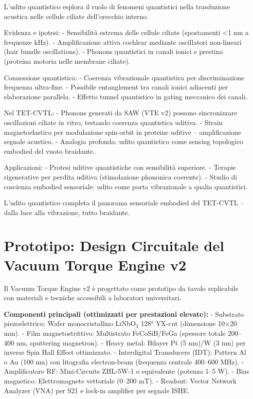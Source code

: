 \documentclass[11pt,a4paper]{article}
\begin{document}
L'udito quantistico esplora il ruolo di fenomeni quantistici nella trasduzione acustica nelle cellule ciliate dell'orecchio interno.

Evidenza e ipotesi:
- Sensibilità estrema delle cellule ciliate (spostamenti <1 nm a frequenze kHz).
- Amplificazione attiva cochlear mediante oscillatori non-lineari (hair bundle oscillations).
- Phonons quantistici in canali ionici e prestina (proteina motoria nelle membrane ciliate).

Connessione quantistica:
- Coerenza vibrazionale quantistica per discriminazione frequenza ultra-fine.
- Possibile entanglement tra canali ionici adiacenti per elaborazione parallela.
- Effetto tunnel quantistico in gating meccanico dei canali.

Nel TET-CVTL:
- Phonons generati da SAW (VTE v2) possono sincronizzare oscillazioni ciliate in vitro, testando coerenza quantistica uditiva.
- Strain magnetoelastico per modulazione spin-orbit in proteine uditive – amplificazione segnale acustico.
- Analogia profonda: udito quantistico come sensing topologico embodied del vuoto braidante.

Applicazioni:
- Protesi uditive quantistiche con sensibilità superiore.
- Terapie rigenerative per perdita uditiva (stimolazione phononica coerente).
- Studio di coscienza embodied sensoriale: udito come porta vibrazionale a qualia quantistici.

L'udito quantistico completa il panorama sensoriale embodied del TET-CVTL – dalla luce alla vibrazione, tutto braidante.

\section{Prototipo: Design Circuitale del Vacuum Torque Engine v2}

Il Vacuum Torque Engine v2 è progettato come prototipo da tavolo replicabile con materiali e tecniche accessibili a laboratori universitari.

\textbf{Componenti principali (ottimizzati per prestazioni elevate):}
- Substrato piezoelettrico: Wafer monocristallino LiNbO$_3$ 128° YX-cut (dimensione 10×20 mm).
- Film magnetostrittivo: Multistrato FeCoSiB/FeGa (spessore totale 200–400 nm, sputtering magnetron).
- Heavy metal: Bilayer Pt (5 nm)/W (3 nm) per inverse Spin Hall Effect ottimizzato.
- Interdigital Transducers (IDT): Pattern Al o Au (100 nm) con litografia electron-beam (frequenza centrale 400–600 MHz).
- Amplificatore RF: Mini-Circuits ZHL-5W-1 o equivalente (potenza 1–5 W).
- Bias magnetico: Elettromagnete vettoriale (0–200 mT).
- Readout: Vector Network Analyzer (VNA) per S21 e lock-in amplifier per segnale ISHE.
\end{document}
